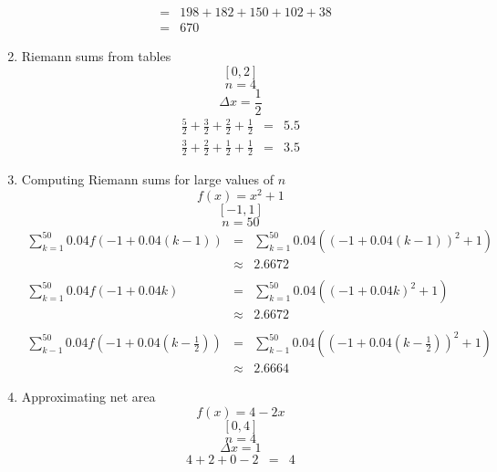 \documentclass{article}
\begin{document}
\begin{enumerate}
\begin{eqnarray}
                                                      &=& 198 + 182 + 150 + 102 + 38 \\
                                                      &=& 670
            \end{eqnarray}
        \item Riemann sums from tables
            $$[0,2]$$
            $$n = 4$$
            $$\Delta{x} = \frac{1}{2}$$
            \begin{eqnarray}
                \frac{5}{2} + \frac{3}{2} + \frac{2}{2} + \frac{1}{2} &=& 5.5 \\
                \frac{3}{2} + \frac{2}{2} + \frac{1}{2} + \frac{1}{2} &=& 3.5
            \end{eqnarray}
        \item Computing Riemann sums for large values of $n$
            $$f(x) = x^2 + 1$$
            $$[-1, 1]$$
            $$n = 50$$
            \begin{eqnarray}
                \sum_{k = 1}^{50}{0.04f\left(-1 + 0.04\left(k - 1\right)\right)} &=& \sum_{k = 1}^{50}{0.04\left(\left(-1 + 0.04\left(k - 1\right)\right)^2 + 1\right)} \\
                                                                                 &\approx& 2.6672 \\
                                                                                 \nonumber \\
                \sum_{k = 1}^{50}{0.04f\left(-1 + 0.04k\right)} &=& \sum_{k = 1}^{50}{0.04\left(\left(-1 + 0.04k\right)^2 + 1\right)} \\
                                                                &\approx& 2.6672 \\
                                                                \nonumber \\
                \sum_{k - 1}^{50}{0.04f\left(-1 + 0.04\left(k - \frac{1}{2}\right)\right)} &=& \sum_{k - 1}^{50}{0.04\left(\left(-1 + 0.04\left(k - \frac{1}{2}\right)\right)^2 + 1\right)} \\
                                                                                           &\approx& 2.6664
            \end{eqnarray}
    \item Approximating net area
        $$f(x) = 4 - 2x$$
        $$[0,4]$$
        $$n = 4$$
        $$\Delta{x} = 1$$
        \begin{eqnarray}
            4 + 2 + 0 - 2 &=& 4 \\

\end{eqnarray}
\end{enumerate}
\end{document}
